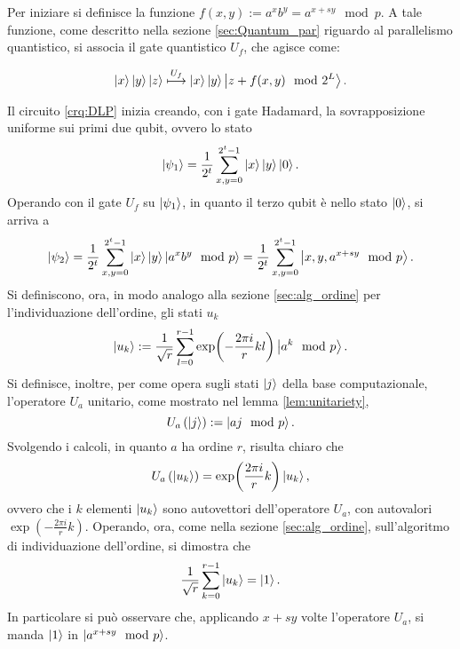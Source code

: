 Per iniziare si definisce la funzione $f(x,y) := a^xb^y = a^{x+sy} \mod p$.
A tale funzione, come descritto nella sezione \ref{sec:Quantum_par} riguardo al parallelismo quantistico, si associa il gate quantistico $U_f$, che agisce come:

\begin{equation}
 \ket{x}\ket{y}\ket{z} \stackrel{U_f}{\longmapsto} \ket{x}\ket{y}\ket{z + f(x,y) \mod 2^L}.
\end{equation}

Il circuito \ref{crq:DLP} inizia creando, con i gate Hadamard, la sovrapposizione uniforme sui primi due qubit, ovvero lo stato
\begin{equation}
 \ket{\psi_1} = \frac{1}{2^t}\sum_{x,y = 0}^{2^t-1} \ket{x}\ket{y}\ket{0}.
\end{equation}
Operando con il gate $U_f$ su $\ket{\psi_1}$, in quanto il terzo qubit è nello stato $\ket{0}$, si arriva a
\begin{equation}
 \ket{\psi_2} = \frac{1}{2^t}\sum_{x,y = 0}^{2^t-1} \ket{x}\ket{y}\ket{a^xb^y \mod p} = 
 \frac{1}{2^t}\sum_{x,y = 0}^{2^t-1} \ket{x,y,a^{x+sy} \mod p}.
\end{equation}
Si definiscono, ora, in modo analogo alla sezione \ref{sec:alg_ordine} per l'individuazione dell'ordine, gli stati $u_k$
\begin{equation}
 \ket{u_k} := \frac{1}{\sqrt{r}}\sum_{l=0}^{r-1} \exp(-\frac{2 \pi i}{r} kl) \ket{a^k \mod p}.
\end{equation}
Si definisce, inoltre, per come opera sugli stati $\ket{j}$ della base computazionale, l'operatore $U_a$ unitario, come mostrato nel lemma \ref{lem:unitariety},
 \begin{equation}
 U_a\left(\ket{j} \right) := \ket{aj \mod p}.
\end{equation}
Svolgendo i calcoli, in quanto $a$ ha ordine $r$, risulta chiaro che 
\begin{equation}
  U_a\left(\ket{u_k} \right) = \exp(\frac{2 \pi i}{r} k) \ket{u_k},
\end{equation}
ovvero che i $k$ elementi $\ket{u_k}$ sono autovettori dell'operatore $U_a$, con autovalori $\exp(-\frac{2 \pi i}{r} k)$.
Operando, ora, come nella sezione \ref{sec:alg_ordine}, sull'algoritmo di individuazione dell'ordine, si dimostra che
\begin{equation}\label{eqn:sum_eigenvectors}
  \frac{1}{\sqrt{r}}\sum_{k=0}^{r-1}\ket{u_k} = \ket{1}.
\end{equation}
In particolare si può osservare che, applicando $x + sy$ volte l'operatore $U_a$, si manda $\ket{1}$ in $\ket{a^{x+sy} \mod p}$.
